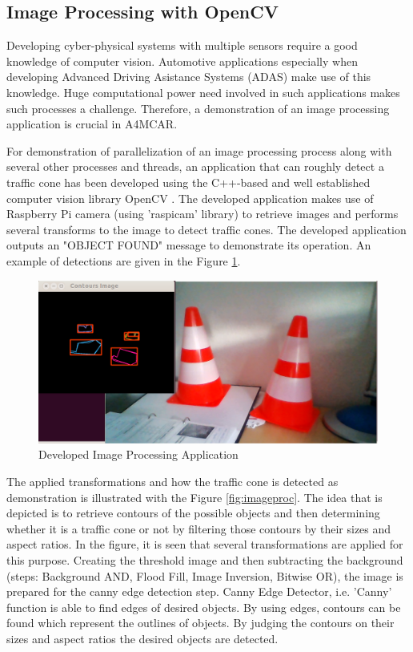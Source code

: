 \subsection{Image Processing with OpenCV}
Developing cyber-physical systems with multiple sensors require a good knowledge of computer vision. Automotive applications especially when developing Advanced Driving Asistance Systems (ADAS) make use of this knowledge. Huge computational power need involved in such applications makes such processes a challenge. Therefore, a demonstration of an image processing application is crucial in A4MCAR.

For demonstration of parallelization of an image processing process along with several other processes and threads, an application that can roughly detect a traffic cone has been developed using the C++-based and well established computer vision library OpenCV \cite{opencv}. The developed application makes use of Raspberry Pi camera (using 'raspicam' library) to retrieve images and performs several transforms to the image to detect traffic cones. The developed application outputs an "OBJECT FOUND" message to demonstrate its operation. An example of detections are given in the Figure \ref{fig:traffic_cone_detection}.

\begin{figure}[!ht]
	\centering
	\captionsetup{justification=centering}
	\includegraphics[scale=0.15]{content/images/traffic_cone_detection.png}
	\caption{Developed Image Processing Application}
	\label{fig:traffic_cone_detection}
\end{figure}

The applied transformations and how the traffic cone is detected as demonstration is illustrated with the Figure \ref{fig:imageproc}. The idea that is depicted is to retrieve contours of the possible objects and then determining whether it is a traffic cone or not by filtering those contours by their sizes and aspect ratios. In the figure, it is seen that several transformations are applied for this purpose. Creating the threshold image and then subtracting the background (steps: Background AND, Flood Fill, Image Inversion, Bitwise OR), the image is prepared for the canny edge detection step. Canny Edge Detector, i.e. 'Canny' function is able to find edges of desired objects. By using edges, contours can be found which represent the outlines of objects. By judging the contours on their sizes and aspect ratios the desired objects are detected.

